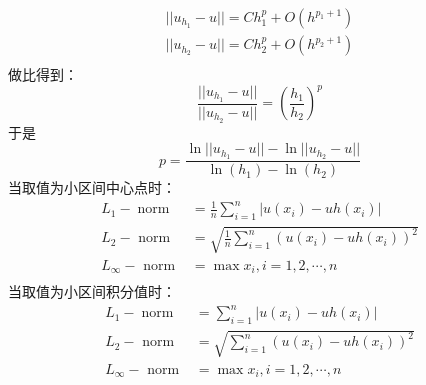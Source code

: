 \documentclass{article}
\numberwithin{equation}{subsection}    %
\begin{document}
\begin{appendix}
    \begin{equation}
        \begin{aligned}
            || u_{h_1}-u || = Ch_1^p + O(h^{p_1+1}) \\
            || u_{h_2}-u || = Ch_2^p + O(h^{p_2+1}) \\
        \end{aligned}
    \end{equation}
    做比得到：
    \begin{equation}
        \frac{|| u_{h_1}-u ||}{|| u_{h_2}-u ||} = \left(\frac{h_1}{h_2}\right)^p
    \end{equation}
    于是
    \begin{equation}
        p = \frac{\ln|| u_{h_1}-u ||-\ln|| u_{h_2}-u ||}{\ln(h_1)-\ln(h_2)}
    \end{equation}
    当取值为小区间中心点时：
    \begin{equation}
        \begin{aligned}
            L_{1}-\operatorname{norm} & =\frac{1}{n} \sum_{i=1}^{n}\left|u\left(x_{i}\right)-u h\left(x_{i}\right)\right|            \\
            L_{2}-\text { norm }      & =\sqrt{\frac{1}{n} \sum_{i=1}^{n}\left(u\left(x_{i}\right)-u h\left(x_{i}\right)\right)^{2}} \\
            L_{\infty}-\text { norm } & =\max x_i,i=1,2,\cdots,n                                                                     \\
        \end{aligned}
    \end{equation}
    当取值为小区间积分值时：
    \begin{equation}
        \begin{aligned}
            L_{1}-\operatorname{norm} & =\sum_{i=1}^{n}\left|u\left(x_{i}\right)-u h\left(x_{i}\right)\right|            \\
            L_{2}-\text { norm }      & =\sqrt{\sum_{i=1}^{n}\left(u\left(x_{i}\right)-u h\left(x_{i}\right)\right)^{2}} \\
            L_{\infty}-\text { norm } & =\max x_i,i=1,2,\cdots,n                                                         \\
        \end{aligned}
    \end{equation}





\end{appendix}



\end{document}
